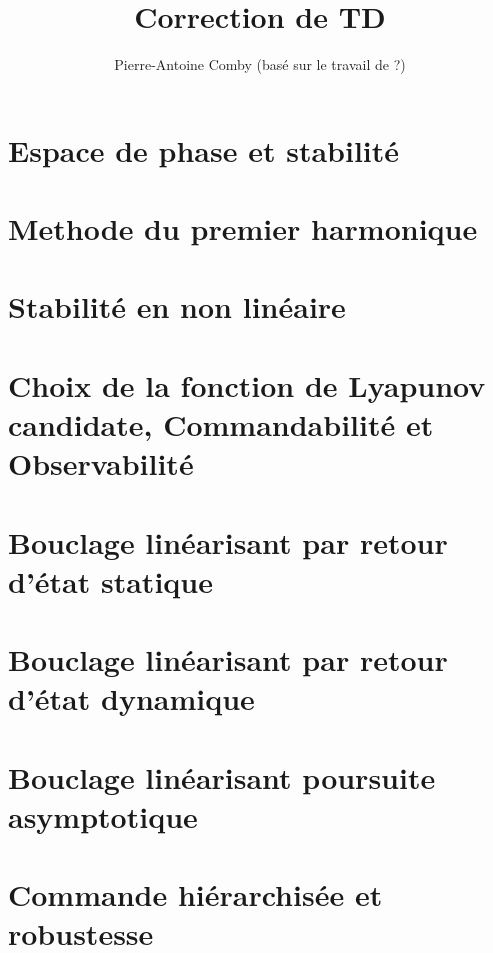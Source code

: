 \documentclass{../../td}
\title{Correction de TD}
\author{Pierre-Antoine Comby (basé sur le travail de ?)}
\begin{document}
\maketitle
\tableofcontents
\section{Espace de phase et stabilité}

\section{Methode du premier harmonique}

\section{Stabilité en non linéaire}


\section{Choix de la fonction de Lyapunov candidate, Commandabilité et Observabilité}

\section{Bouclage linéarisant par retour d'état statique}

\section{Bouclage linéarisant par retour d'état dynamique}

\section{Bouclage linéarisant poursuite asymptotique}

\section{Commande hiérarchisée et robustesse}

\end{document}
